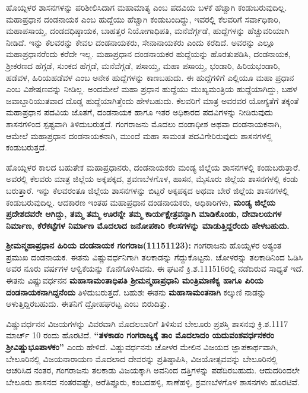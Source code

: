 ಹೊಯ್ಸಳರ ಶಾಸನಗಳನ್ನು ಪರಿಶೀಲಿಸಿದಾಗ ಮಹಾಮಾತ್ಯ ಎಂಬ ಪದವಿಯ ಬಳಕೆ ಹೆಚ್ಚಾಗಿ ಕಂಡುಬರುವುದಿಲ್ಲ. ಮಹಾಪ್ರಧಾನ ದಂಡನಾಯಕ ಎಂಬ ಹುದ್ದೆಯು ಹೆಚ್ಚಾಗಿ ಕಂಡುಬಂದಿದ್ದು, ಇವರಲ್ಲಿ ಕೆಲವರಿಗೆ ಸರ್ವಾಧಿಕಾರಿ, ಮಹಾಪಸಾಯ್ತ, ದಂಡದಧಿಷ್ಠಾಯಕ, ಬಾಹತ್ತರ ನಿಯೋಗಾಧಿಪತಿ, ಮನೆವೆರ್ಗ್ಗಡೆ, ಹುದ್ದೆಗಳನ್ನು ಹೆಚ್ಚುವರಿಯಾಗಿ ನೀಡಿದೆ. ಇನ್ನು ಕೆಲವರನ್ನು ಕೇವಲ ದಂಡನಾಯಕರು, ಸೇನಾನಾಯಕರು ಎಂದು ಕರೆದಿದೆ. ಅವರನ್ನು ಎಲ್ಲೂ ಮಹಾಪ್ರಧಾನರೆಂದು ಕರೆದೇ ಇಲ್ಲ. ಮಹಾಪ್ರಧಾನ ದಂಡನಾಯಕರ ಹುದ್ದೆಯನ್ನು ಹೊರತುಪಡಿಸಿ, ದಂಡನಾಯಕ, ಶ‍್ರೀಕರಣದ ಹೆಗ್ಗಡೆ, ಸುಂಕದ ಹೆಗ್ಗಡೆ, ಮನೆವೆಗ್ಗಡೆ, ಪಸಾಯ್ತ, ಮಹಾ ಪಸಾಯ್ತ, ಭಂಡಾರಿ, ಹಿರಿಯಭಂಡಾರಿ, ಹಡೆವಳ, ಹಿರಿಯಹಡೆವಳ ಎಂಬ ಅನೇಕ ಹುದ್ದೆಗಳನ್ನು ಕಾಣಬಹುದು. ಈ ಹುದ್ದೆಗಳಿಗೆ ಎಲ್ಲಿಯೂ ಮಹಾ ಪ್ರಧಾನ ಎಂಬ ವಿಶೇಷಣವನ್ನು ನೀಡಿಲ್ಲ. ಅಂದಮೇಲೆ ಮಹಾ ಪ್ರಧಾನ ಹುದ್ದೆಯು ಮುಖ್ಯಮಂತ್ರಿಯ ಹುದ್ದೆಯಾಗಿದ್ದು, ಬಹಳ ಜವಾಬ್ದಾರಿಯುತವಾದ ದೊಡ್ಡ ಹುದ್ದೆಯಾಗಿತ್ತೆಂದು ಹೇಳಬಹುದು. ಕೆಲವರಿಗೆ ಮಾತ್ರ ಅವರವರ ಯೋಗ್ಯತೆಗೆ ತಕ್ಕಂತೆ ಮಹಾಪ್ರಧಾನ ಪದವಿಯ ಜೊತಗೆ, ದಂಡನಾಯಕ ಹಾಗೂ ಇತರ ಅಧಿಕಾರದ ಪದವಿಗಳನ್ನು ನೀಡಿರುವುದು ಶಾಸನಗಳಿಂದ ಸ್ಪಷ್ಟವಾಗಿ ತಿಳಿದುಬರುತ್ತದೆ. ಗಂಗರಾಜನು ಮೊದಲು ದಂಡಾಧೀಶ ಅಥವಾ ದಂಡನಾಯಕನಾಗಿ, ಆಮೇಲೆ ಮಹಾಪ್ರಧಾನ ದಂಡನಾಯಕನಾಗಿ, ಮುಂದೆ ಮಹಾ ಸಾಮಂತ ಪದವಿಗೇರಿರುವುದು ಶಾಸನಗಳಲ್ಲಿ ಕಂಡುಬರುತ್ತದೆ.

ಹೊಯ್ಸಳರ ಕಾಲದ ಬಹುತೇಕ ಮಹಾಪ್ರಧಾನರು, ದಂಡನಾಯಕರು ಮಂಡ್ಯ ಜಿಲ್ಲೆಯ ಶಾಸನಗಳಲ್ಲಿ ಕಂಡು\-ಬರುತ್ತಾರೆ. ಅವರಲ್ಲಿ ಕೆಲವರು ಮಾತ್ರ ಜಿಲ್ಲೆಯ ಅಕ್ಕಪಕ್ಕದ, ಶ್ರವಣಬೆಳಗೊಳ, ಹಾಸನ, ಮೈಸೂರು ಜಿಲ್ಲೆಯ ಶಾಸನಗಳಲ್ಲಿ ಕಂಡು ಬರುತ್ತಾರೆ. ಇನ್ನು ಕೆಲವರಂತೂ ಜಿಲ್ಲೆಯ ಶಾಸನಗಳನ್ನು ಬಿಟ್ಟರೆ ಅಕ್ಕಪಕ್ಕದ ಅಥವಾ ಬೇರೆ ಜಿಲ್ಲೆಯ ಶಾಸನಗಳಲ್ಲಿ ಕಂಡುಬರುವುದಿಲ್ಲ. ಆದಕಾರಣ ಇಂತಹ ಮಹಾಪ್ರಧಾನ ದಂಡನಾಯಕರು, ಅಧಿಕಾರಿಗಳು, \textbf{ಮಂಡ್ಯ ಜಿಲ್ಲೆಯ ಪ್ರದೇಶದವರೇ ಆಗಿದ್ದು, ತಮ್ಮ ತಮ್ಮ ಊರನ್ನೇ ತಮ್ಮ ಕಾರ್ಯಕ್ಷೇತ್ರವನ್ನಾಗಿ ಮಾಡಿಕೊಂಡು, ದೇವಾಲಯಗಳ ನಿರ್ಮಾಣ, ಕೆರೆಕಟ್ಟೆಗಳ ನಿರ್ಮಾಣ ಮೊದಲಾದ ಜನೋಪಕಾರಿ ಕೆಲಸಗಳನ್ನು ಮಾಡುತ್ತಿದ್ದರೆಂದು ಹೇಳಬಹುದು.}

\textbf{ಶ‍್ರೀಮನ್ಮಹಾಪ್ರಧಾನ ಹಿರಿಯ ದಂಡನಾಯಕ ಗಂಗರಾಜ(1115\general{\enginline{-}}1123):} ಗಂಗರಾಜನು ಹೊಯ್ಸಳರ ಅತ್ಯಂತ ಪ್ರಮುಖ ದಂಡನಾಯಕ. ಈತನು ವಿಷ್ಣುವರ್ಧನಿಗಾಗಿ ತಲಕಾಡನ್ನು ಗೆದ್ದುಕೊಟ್ಟನು. ಚೋಳರನ್ನು ತಲಕಾಡಿನಿಂದ ಓಡಿಸಿ ಅವರ ನೂರು ವರ್ಷಗಳ ಆಳ್ವಿಕೆಯನ್ನು ಕೊನೆಗೊಳಿಸಿದನು. ಈ ಘಟನೆ ಕ್ರಿ.ಶ.1115\enginline{-}16ರಲ್ಲಿ ನಡೆದಿರುವ ಸಾಧ್ಯತೆ ಇದೆ. ಈತನು ವಿಷ್ಣುವರ್ಧನನ \textbf{ಮಹಾಸಾಮಂತಾಧಿಪತಿ ಶ‍್ರೀಮನ್ಮಹಾಪ್ರಧಾನಿ ಮಂತ್ರಿಮಾಣಿಕ್ಯ ಹಾಗೂ ಪಿರಿಯ ದಂಡನಾಯಕನಾಗಿದ್ದನೆಂದು }ತಿಳಿದುಬರುತ್ತದೆ. ಬಹುಶಃ ಈತನು \textbf{ಮಹಾಸಾಮಂತನಾಗಿ} ಕಲ್ಕುಣಿ ನಾಡನ್ನು ಆಳುತ್ತಿದ್ದಿರ\-ಬಹುದು. ಈತನಿಗೆ ದ್ರೋಹಘರಟ್ಟ ಎಂಬ ಬಿರುದಿತ್ತು.

ವಿಷ್ಣುವರ್ಧನನ ವಿಜಯಗಳನ್ನು ವಿವರವಾಗಿ ಮೊದಲಬಾರಿಗೆ ತಿಳಿಸುವ ಬೇಲೂರು ಪ್ರಶಸ್ತಿ ಶಾಸನವು ಕ್ರಿ.ಶ.1117 ಮಾರ್ಚ್ 10 ರಂದು ಹೊರಟಿದೆ. \textbf{“ತಳಕಾಡಂ ಗಂಗರಾಜ್ಯಕ್ಕೆ ತಾಂ ಮೊದಲಾದಂ ಯದುವಂಶವರ್ಧನಕರಂ ಶ‍್ರೀವಿಷ್ಣು\-ಭೂಪಾಳಕಂ” }ಎಂದು ಹೇಳಿದೆ. ವಿಷ್ಣುವರ್ಧನನು ಚೋಳರ ಮೇಲಿನ ವಿಜಯದ ಜ್ಞಾಪಕಾರ್ಥವಾಗಿ, ಬೇಲೂರಿನಲ್ಲಿ ವಿಜಯನಾರಾಯಣ ಮೊದಲಾದ ದೇವರನ್ನು ಪ್ರತಿಷ್ಠಾಪಿಸಿ, ವಿಜಯೋತ್ಸವವನ್ನು ಬೇಲೂರಿನಲ್ಲಿ ಆಚರಿಸಿದ ನಂತರ, ಗಂಗರಾಜನು ತಲಕಾಡು ವಿಜಯಕ್ಕಾಗಿ ಅವನಿಂದ ದತ್ತಿಗಳನ್ನು ಪಡೆದಿರಬಹುದು. ಆದುದರಿಂದಲೇ ಬೇಲೂರು ಶಾಸನದ ನಂತರವಷ್ಟೇ, ಅರೆತಿಪ್ಪೂರು, ಕಂಬದಹಳ್ಳಿ, ಸಾಣೆಹಳ್ಳಿ, ಶ್ರವಣಬೆಳಗೊಳ ಶಾಸನಗಳು ಹೊರಟಿವೆ.

